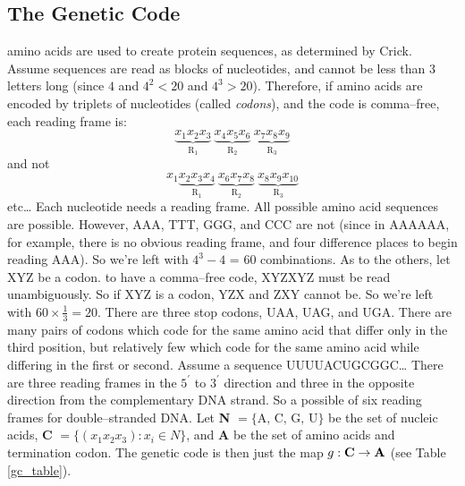 \documentclass[../waterman_intro_comp_bio.tex]{subfiles}
\begin{document}
    \subsection{The Genetic Code}
        \begin{outline}
             amino acids are used to create protein sequences, as determined by Crick.
                \2 Assume sequences are read as blocks of nucleotides, and cannot be less than 3 letters long (since \(4\) and \(4^{2} < 20\) and \(4^3 > 20\)).
                \2 Therefore, if amino acids are encoded by triplets of nucleotides (called \textit{codons}), and the code is comma--free, each reading frame is:
                    \begin{equation*}
                        \underbrace{x_1 x_2 x_3}_{\text{R}_1} ~ \underbrace{x_4 x_5 x_6}_{\text{R}_2} ~\underbrace{x_7 x_8 x_9}_{\text{R}_3} 
                    \end{equation*}
                and not
                    \begin{equation*}
                        x_1 \underbrace{x_2 x_3 x_4}_{\text{R}_1} ~ \underbrace{x_6 x_7 x_8}_{\text{R}_2} ~\underbrace{x_8 x_9 x_{10}}_{\text{R}_3} 
                    \end{equation*}
                etc\ldots
                \2 Each nucleotide needs a reading frame.
                \2 All possible amino acid sequences are possible. However, AAA, TTT, GGG, and CCC are not (since in AAAAAA, for example, there is no obvious reading frame, and four difference places to begin reading AAA). So we're left with \(4^3 - 4\) = 60 combinations.
                \2 As to the others, let XYZ be a codon. to have a comma--free code, XYZXYZ must be read unambiguously. So if XYZ is a codon, YZX and ZXY cannot be. So we're left with \(60 \times \frac{1}{3} = 20 \).
            \1 There are three stop codons, UAA, UAG, and UGA.
            \1 There are many pairs of codons which code for the same amino acid that differ only in the third position, but relatively few which code for the same amino acid while differing in the first or second.
            \1 Assume a sequence UUUUACUGCGGC\ldots
                \2 There are three reading frames in the \(5^{\prime}\) to \(3^{\prime}\) direction and three in the opposite direction from the complementary DNA strand. So a possible of six reading frames for double--stranded DNA.
            \1 Let \textbf{N} \(= \{\text{A, C, G, U}\}\) be the set of nucleic acids, \textbf{C} \(= \{(x_1 x_2 x_3) : x_i \in N\}\), and \textbf{A} be the set of amino acids and termination codon. The genetic code is then just the map \(g : \text{\textbf{C}} \rightarrow \text{\textbf{A}}\) (see Table \ref{gc_table}).

\end{outline}
\end{document}
